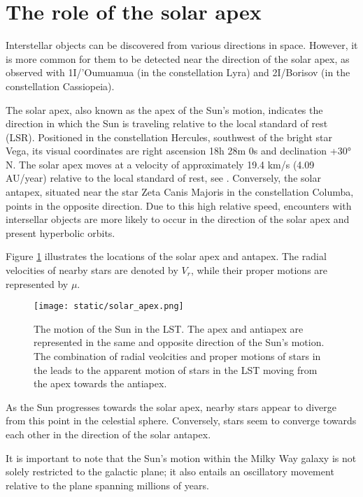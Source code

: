 \section{The role of the solar apex}


Interstellar objects can be discovered from various directions in space.
However, it is more common for them to be detected near the direction of the
solar apex, as observed with 1I/'Oumuamua (in the constellation Lyra) and 2I/Borisov
(in the constellation Cassiopeia).

The solar apex, also known as the apex of the Sun's motion, indicates the
direction in which the Sun is traveling relative to the local standard of rest
(LSR). Positioned in the constellation Hercules, southwest of the bright star
Vega, its visual coordinates are right ascension 18h 28m 0s and declination +30°
N. The solar apex moves at a velocity of approximately 19.4 km/s (4.09 AU/year)
relative to the local standard of rest, see \cite{dehnen1998}. Conversely, the
solar antapex, situated near the star Zeta Canis Majoris in the constellation
Columba, points in the opposite direction. Due to this high relative speed,
encounters with intersellar objects are more likely to occur in the direction of
the solar apex and present hyperbolic orbits.

Figure \ref{fig:solar_apex} illustrates the locations of the solar apex and
antapex. The radial velocities of nearby stars are denoted by $V_r$, while their
proper motions are represented by $\mu$.

\begin{figure}[H]
  \centering
  \texttt{[image: static/solar\_apex.png]}
  \caption[The motion of the Sun in the LST.]
  {
    The motion of the Sun in the LST. The apex and antiapex are
    represented in the same and opposite direction of the Sun's motion.
    The combination of radial veolcities and proper motions of stars in the
    leads to the apparent motion of stars in the LST moving from the apex
    towards the antiapex.
  }
  \label{fig:solar_apex}
\end{figure}

As the Sun progresses towards the solar apex, nearby stars appear to diverge
from this point in the celestial sphere. Conversely, stars seem to converge
towards each other in the direction of the solar antapex.

It is important to note that the Sun's motion within the Milky Way galaxy is not
solely restricted to the galactic plane; it also entails an oscillatory movement
relative to the plane spanning millions of years.

